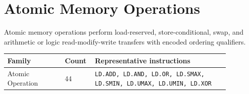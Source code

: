 \section{Atomic Memory Operations}
Atomic memory operations perform load-reserved, store-conditional, swap, and arithmetic or logic read-modify-write transfers with encoded ordering qualifiers.\par\smallskip
{\scriptsize
\begin{longtable}{@{}L{0.24\linewidth}R{0.09\linewidth}L{0.56\linewidth}@{}}
\toprule
Family & Count & Representative instructions \\
\midrule
Atomic Operation & 44 & \texttt{LD.ADD, LD.AND, LD.OR, LD.SMAX, LD.SMIN, LD.UMAX, LD.UMIN, LD.XOR} \\
\bottomrule
\end{longtable}
}

